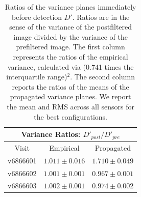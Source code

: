 \documentclass[prd, nofootinbib, floatfix, 11pt,tightenlines,times]{article}
\begin{document}
\begin{table}
\centering
\begin{tabular}{ccc}
\hline
\multicolumn{3}{|c|}{Variance Ratios: $D'_{post} / D'_{pre}$} \\
\hline
Visit    & Empirical & Propagated \\
\hline
v6866601 & $1.011 \pm 0.016$    & $1.710 \pm 0.049$    \\
v6866602 & $1.001 \pm 0.001$    & $0.967 \pm 0.001$    \\
v6866603 & $1.002 \pm 0.001$    & $0.974 \pm 0.002$    \\
\end{tabular}
\caption{Ratios of the variance planes immediately before detection
  $D'$.  Ratios are in the sense of the variance of the postfiltered
  image divided by the variance of the prefiltered image.  The first
  column represents the ratios of the empirical variance, calculated
  via (0.741 times the interquartile range)$^2$.  The second column
  reports the ratios of the means of the propagated variance planes.
  We report the mean and RMS across all sensors for the best
  configurations.}
\label{tab-variance2}
\end{table}


\clearpage
\end{document}
